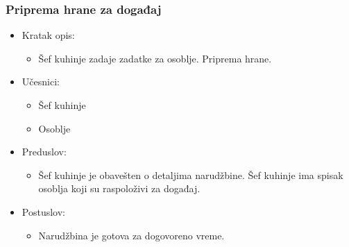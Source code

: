 \documentclass[a4paper]{article}
\begin{document}
\subsubsection{Priprema hrane za događaj}
\begin{itemize}
    \item Kratak opis:
    \begin{itemize}
        \item Šef kuhinje zadaje zadatke za osoblje. Priprema hrane.
    \end{itemize}
\end{itemize}
  \begin{itemize}
        \item Učesnici:
          \begin{itemize}
        \item Šef kuhinje
    \end{itemize}
      \begin{itemize}
        \item Osoblje
    \end{itemize}
    \end{itemize}
      \begin{itemize}
        \item Preduslov:
          \begin{itemize}
        \item Šef kuhinje je obavešten o detaljima narudžbine. Šef kuhinje ima spisak osoblja koji su raspoloživi za događaj.
   \end{itemize}
    
    \end{itemize}
      \begin{itemize}
        \item Postuslov:
          \begin{itemize}
        \item Narudžbina je gotova za dogovoreno vreme.
    \end{itemize}
    \end{itemize}
\end{document}
